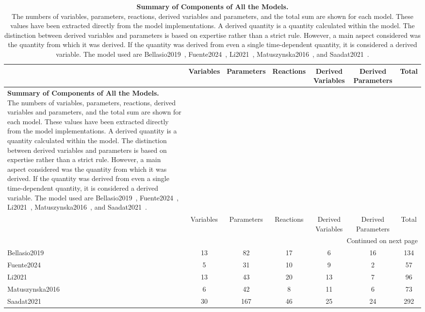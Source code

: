 \begin{longtable}{lcccccc}
\caption[Summary of Components of All the Models.]{\textbf{Summary of Components of All the Models.}\\The numbers of variables, parameters, reactions, derived variables and parameters, and the total sum are shown for each model. These values have been extracted directly from the model implementations. A derived quantity is a quantity calculated within the model. The distinction between derived variables and parameters is based on expertise rather than a strict rule. However, a main aspect considered was the quantity from which it was derived. If the quantity was derived from even a single time-dependent quantity, it is considered a derived variable. The model used are Bellasio2019~\cite{bellasioGeneralisedDynamicModel2019}, Fuente2024~\cite{fuenteMathematicalModelSimulate2024}, Li2021~\cite{liImpactIonFluxes2021}, Matuszynska2016~\cite{matuszynskaMathematicalModelNonphotochemical2016}, and Saadat2021~\cite{saadatComputationalAnalysisAlternative2021}.} \label{tab:models-meta} \\
\toprule
 & Variables & Parameters & Reactions & Derived Variables & Derived Parameters & Total \\
\midrule
\endfirsthead
\caption[]{\textbf{Summary of Components of All the Models.}\\The numbers of variables, parameters, reactions, derived variables and parameters, and the total sum are shown for each model. These values have been extracted directly from the model implementations. A derived quantity is a quantity calculated within the model. The distinction between derived variables and parameters is based on expertise rather than a strict rule. However, a main aspect considered was the quantity from which it was derived. If the quantity was derived from even a single time-dependent quantity, it is considered a derived variable. The model used are Bellasio2019~\cite{bellasioGeneralisedDynamicModel2019}, Fuente2024~\cite{fuenteMathematicalModelSimulate2024}, Li2021~\cite{liImpactIonFluxes2021}, Matuszynska2016~\cite{matuszynskaMathematicalModelNonphotochemical2016}, and Saadat2021~\cite{saadatComputationalAnalysisAlternative2021}.} \\
\toprule
 & Variables & Parameters & Reactions & Derived Variables & Derived Parameters & Total \\
\midrule
\endhead
\midrule
\multicolumn{7}{r}{Continued on next page} \\
\midrule
\endfoot
\bottomrule
\endlastfoot
Bellasio2019 & 13 & 82 & 17 & 6 & 16 & 134 \\
Fuente2024 & 5 & 31 & 10 & 9 & 2 & 57 \\
Li2021 & 13 & 43 & 20 & 13 & 7 & 96 \\
Matuszynska2016 & 6 & 42 & 8 & 11 & 6 & 73 \\
Saadat2021 & 30 & 167 & 46 & 25 & 24 & 292 \\
\end{longtable}
